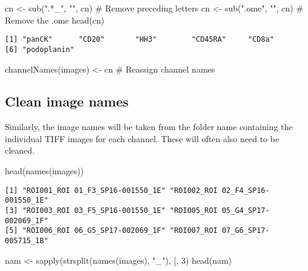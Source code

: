 \documentclass[
  letterpaper,
  DIV=11,
  numbers=noendperiod]{scrreprt}
\newenvironment{Shaded}{\begin{snugshade}}{\end{snugshade}}
\newcommand{\AttributeTok}[1]{\textcolor[rgb]{0.40,0.45,0.13}{#1}}
\newcommand{\CommentTok}[1]{\textcolor[rgb]{0.37,0.37,0.37}{#1}}
\newcommand{\DecValTok}[1]{\textcolor[rgb]{0.68,0.00,0.00}{#1}}
\newcommand{\FunctionTok}[1]{\textcolor[rgb]{0.28,0.35,0.67}{#1}}
\newcommand{\NormalTok}[1]{\textcolor[rgb]{0.00,0.23,0.31}{#1}}
\newcommand{\OtherTok}[1]{\textcolor[rgb]{0.00,0.23,0.31}{#1}}
\newcommand{\StringTok}[1]{\textcolor[rgb]{0.13,0.47,0.30}{#1}}
\begin{document}
\begin{Shaded}
\begin{Highlighting}[]
\NormalTok{cn }\OtherTok{\textless{}{-}} \FunctionTok{sub}\NormalTok{(}\StringTok{".*\_"}\NormalTok{, }\StringTok{""}\NormalTok{, cn) }\CommentTok{\# Remove preceding letters}
\NormalTok{cn }\OtherTok{\textless{}{-}} \FunctionTok{sub}\NormalTok{(}\StringTok{".ome"}\NormalTok{, }\StringTok{""}\NormalTok{, cn) }\CommentTok{\# Remove the .ome}
\FunctionTok{head}\NormalTok{(cn)}
\end{Highlighting}
\end{Shaded}

\begin{verbatim}
[1] "panCK"      "CD20"       "HH3"        "CD45RA"     "CD8a"      
[6] "podoplanin"
\end{verbatim}

\begin{Shaded}
\begin{Highlighting}[]
\FunctionTok{channelNames}\NormalTok{(images) }\OtherTok{\textless{}{-}}\NormalTok{ cn }\CommentTok{\# Reassign channel names}
\end{Highlighting}
\end{Shaded}

\subsection{Clean image names}\label{clean-image-names}

Similarly, the image names will be taken from the folder name containing
the individual TIFF images for each channel. These will often also need
to be cleaned.

\begin{Shaded}
\begin{Highlighting}[]
\FunctionTok{head}\NormalTok{(}\FunctionTok{names}\NormalTok{(images))}
\end{Highlighting}
\end{Shaded}

\begin{verbatim}
[1] "ROI001_ROI 01_F3_SP16-001550_1E" "ROI002_ROI 02_F4_SP16-001550_1E"
[3] "ROI003_ROI 03_F5_SP16-001550_1E" "ROI005_ROI 05_G4_SP17-002069_1F"
[5] "ROI006_ROI 06_G5_SP17-002069_1F" "ROI007_ROI 07_G6_SP17-005715_1B"
\end{verbatim}

\begin{Shaded}
\begin{Highlighting}[]
\NormalTok{nam }\OtherTok{\textless{}{-}} \FunctionTok{sapply}\NormalTok{(}\FunctionTok{strsplit}\NormalTok{(}\FunctionTok{names}\NormalTok{(images), }\StringTok{"\_"}\NormalTok{), }\StringTok{\textasciigrave{}}\AttributeTok{[}\StringTok{\textasciigrave{}}\NormalTok{, }\DecValTok{3}\NormalTok{)}
\FunctionTok{head}\NormalTok{(nam)}
\end{Highlighting}
\end{Shaded}
\end{document}
